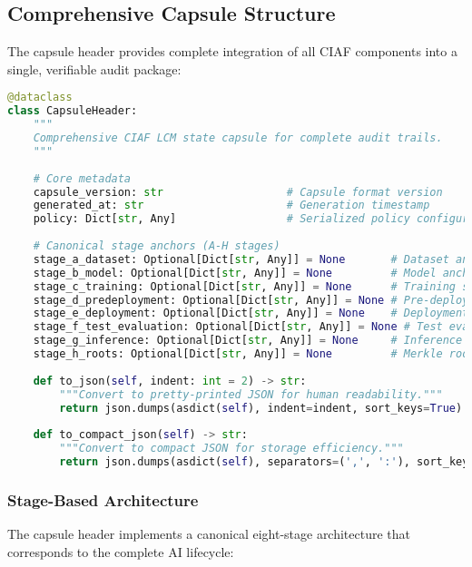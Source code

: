\documentclass[12pt,a4paper]{article}
\begin{document}
\subsection{Comprehensive Capsule Structure}

The capsule header provides complete integration of all CIAF components into a single, verifiable audit package:

\begin{lstlisting}[language=Python, caption=Capsule Header Structure]
@dataclass
class CapsuleHeader:
    """
    Comprehensive CIAF LCM state capsule for complete audit trails.
    """
    
    # Core metadata
    capsule_version: str                   # Capsule format version
    generated_at: str                      # Generation timestamp
    policy: Dict[str, Any]                 # Serialized policy configuration
    
    # Canonical stage anchors (A-H stages)
    stage_a_dataset: Optional[Dict[str, Any]] = None       # Dataset anchor
    stage_b_model: Optional[Dict[str, Any]] = None         # Model anchor
    stage_c_training: Optional[Dict[str, Any]] = None      # Training session
    stage_d_predeployment: Optional[Dict[str, Any]] = None # Pre-deployment
    stage_e_deployment: Optional[Dict[str, Any]] = None    # Deployment
    stage_f_test_evaluation: Optional[Dict[str, Any]] = None # Test evaluation
    stage_g_inference: Optional[Dict[str, Any]] = None     # Inference receipt
    stage_h_roots: Optional[Dict[str, Any]] = None         # Merkle roots
    
    def to_json(self, indent: int = 2) -> str:
        """Convert to pretty-printed JSON for human readability."""
        return json.dumps(asdict(self), indent=indent, sort_keys=True)
    
    def to_compact_json(self) -> str:
        """Convert to compact JSON for storage efficiency."""
        return json.dumps(asdict(self), separators=(',', ':'), sort_keys=True)
\end{lstlisting}

\subsubsection{Stage-Based Architecture}

The capsule header implements a canonical eight-stage architecture that corresponds to the complete AI lifecycle:
\end{document}
